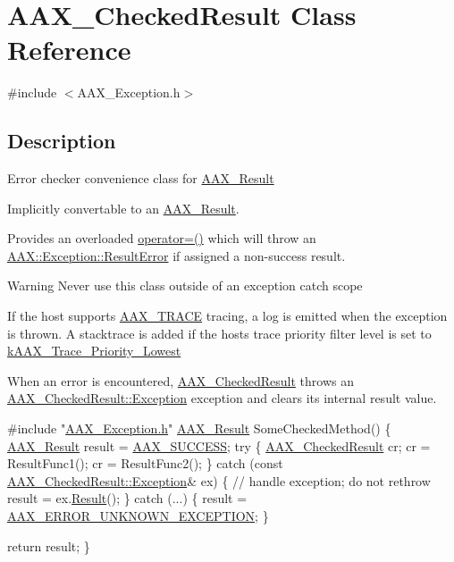 \hypertarget{a00019}{}\section{A\+A\+X\+\_\+\+Checked\+Result Class Reference}
\label{a00019}


{\ttfamily \#include $<$A\+A\+X\+\_\+\+Exception.\+h$>$}



\subsection{Description}
Error checker convenience class for \hyperlink{a00149_a4d8f69a697df7f70c3a8e9b8ee130d2f}{A\+A\+X\+\_\+\+Result}

Implicitly convertable to an \hyperlink{a00149_a4d8f69a697df7f70c3a8e9b8ee130d2f}{A\+A\+X\+\_\+\+Result}.

Provides an overloaded {\ttfamily \hyperlink{a00019_af95bea6f011d9a779170fc6128dc7295}{operator=()}} which will throw an \hyperlink{a00147}{A\+A\+X\+::\+Exception\+::\+Result\+Error} if assigned a non-\/success result.

\begin{DoxyWarning}{Warning}
Never use this class outside of an exception catch scope
\end{DoxyWarning}
If the host supports \hyperlink{a00158_ab53f1d6a94f8b6ebb3a101f71bfe4e82}{A\+A\+X\+\_\+\+T\+R\+A\+C\+E} tracing, a log is emitted when the exception is thrown. A stacktrace is added if the host\textquotesingle{}s trace priority filter level is set to \hyperlink{a00158_a68d0297c90a8d294e19ea781f8cda96a}{k\+A\+A\+X\+\_\+\+Trace\+\_\+\+Priority\+\_\+\+Lowest}

When an error is encountered, \hyperlink{a00019}{A\+A\+X\+\_\+\+Checked\+Result} throws an \hyperlink{a00019_a36fd71afc6d62993c1dd96e1ca9fcc0e}{A\+A\+X\+\_\+\+Checked\+Result\+::\+Exception} exception and clears its internal result value.


\begin{DoxyCode}
\textcolor{preprocessor}{#include "\hyperlink{a00208}{AAX\_Exception.h}"}
\hyperlink{a00149_a4d8f69a697df7f70c3a8e9b8ee130d2f}{AAX\_Result} SomeCheckedMethod()
\{
  \hyperlink{a00149_a4d8f69a697df7f70c3a8e9b8ee130d2f}{AAX\_Result} result = \hyperlink{a00207_a5f8c7439f3a706c4f8315a9609811937aeddbd1bb67e3a66e6af54a4b4a7a57b3}{AAX\_SUCCESS};
  \textcolor{keywordflow}{try} \{
    \hyperlink{a00019}{AAX\_CheckedResult} cr;
    cr = ResultFunc1();
    cr = ResultFunc2();
  \}
  \textcolor{keywordflow}{catch} (\textcolor{keyword}{const} \hyperlink{a00147}{AAX\_CheckedResult::Exception}& ex)
  \{
    \textcolor{comment}{// handle exception; do not rethrow}
    result = ex.\hyperlink{a00147_ab62fbe044cceea7c341ae4dfafb036cc}{Result}();
  \}
  \textcolor{keywordflow}{catch} (...)
  \{
    result = \hyperlink{a00207_a5f8c7439f3a706c4f8315a9609811937a48a5ec1530ce351b081413c73097928f}{AAX\_ERROR\_UNKNOWN\_EXCEPTION};
  \}

  \textcolor{keywordflow}{return} result;
\}
\end{DoxyCode}


